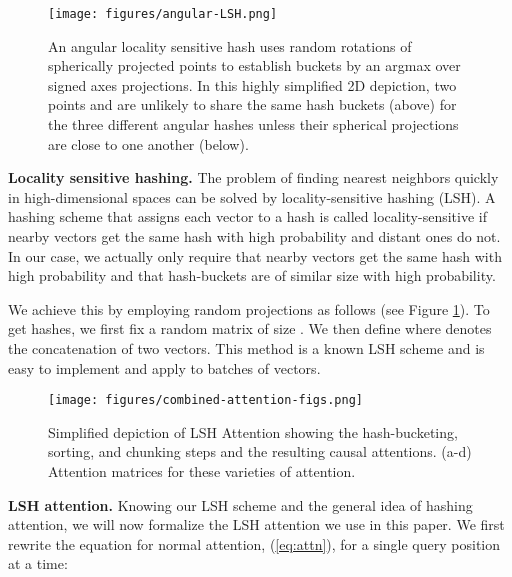 \documentclass{article} \usepackage{iclr2020_conference,times}
\renewcommand{\paragraph}[1]{\textbf{#1}}
\begin{document}
\begin{figure}
    \centering
    \texttt{[image: figures/angular-LSH.png]}
    \caption{An angular locality sensitive hash uses random rotations of spherically projected 
    points to establish buckets by an argmax over signed axes projections.  In this highly 
    simplified 2D depiction, two points  and  are unlikely to share the same hash buckets 
    (above) for the three different angular hashes unless their spherical projections are close 
    to one another (below).}
    \label{fig:lsh}
\end{figure}

\paragraph{Locality sensitive hashing.}
The problem of finding nearest neighbors quickly in high-dimensional spaces
can be solved by locality-sensitive hashing (LSH). A hashing scheme that assigns each
vector  to a hash  is called locality-sensitive if nearby
vectors get the same hash with high probability and distant ones do not.
In our case, we actually only require that nearby vectors get the same
hash with high probability and that hash-buckets are of similar size with
high probability.

We achieve this by employing random projections as follows (see Figure \ref{fig:lsh}).
To get  hashes, we first fix a random matrix  of size .
We then define  where  denotes the concatenation of two vectors.
This method is a known LSH scheme \citep{andoni2015angularLSH} and is easy to implement
and apply to batches of vectors.

\begin{figure}
        \centering
        \texttt{[image: figures/combined-attention-figs.png]}
        \caption{Simplified depiction of LSH Attention showing the hash-bucketing, sorting, 
                  and chunking steps and the resulting causal attentions. (a-d) Attention matrices for these varieties of attention.}
        \label{fig:attnpattern}
\end{figure}

\paragraph{LSH attention.}
Knowing our LSH scheme and the general idea of hashing attention, we will now formalize the LSH attention we use in this paper. We first rewrite the equation for normal attention, (\ref{eq:attn}), for a single query position  at a time:
\end{document}
